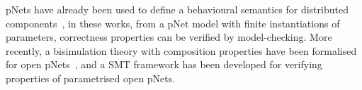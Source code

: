 \documentclass{llncs}
\newcommand{\todoLHin}[2][inline,color=orange!40]{\todo[#1]{\textbf{To-do Ludo: } {#2}}}
\begin{document}
pNets have already been used to define a behavioural semantics for distributed components~\cite{AmeurBoulifa2017}, in these works, from a pNet model with finite instantiations of parameters, correctness properties can be verified by model-checking. 
More recently, a bisimulation theory with composition properties have been formalised for open pNets~\cite{HMZ-FORTE2016}, and a SMT framework has been developed  for verifying properties of parametrised open pNets.

%
%
%
%
\end{document}
